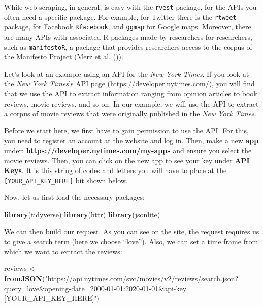 \documentclass[
]{book}
\newenvironment{Shaded}{\begin{snugshade}}{\end{snugshade}}
\newcommand{\FunctionTok}[1]{\textcolor[rgb]{0.13,0.29,0.53}{\textbf{#1}}}
\newcommand{\NormalTok}[1]{#1}
\newcommand{\OtherTok}[1]{\textcolor[rgb]{0.56,0.35,0.01}{#1}}
\newcommand{\StringTok}[1]{\textcolor[rgb]{0.31,0.60,0.02}{#1}}
\begin{document}
While web scraping, in general, is easy with the \texttt{rvest} package, for the APIs you often need a specific package. For example, for Twitter there is the \texttt{rtweet} package, for Facebook \texttt{Rfacebook}, and \texttt{ggmap} for Google maps. Moreover, there are many APIs with associated R packages made by researchers for researchers, such as \texttt{manifestoR}, a package that provides researchers access to the corpus of the Manifesto Project (Merz et al. ()).

Let's look at an example using an API for the \emph{New York Times}. If you look at the \emph{New York Times}'s API page (\url{https://developer.nytimes.com/}), you will find that we use the API to extract information ranging from opinion articles to book reviews, movie reviews, and so on. In our example, we will use the API to extract a corpus of movie reviews that were originally published in the \emph{New York Times}.

Before we start here, we first have to gain permission to use the API. For this, you need to register an account at the website and log in. Then, make a new \textbf{app} under: \textbf{\url{https://developer.nytimes.com/my-apps}} and ensure you select the movie reviews. Then, you can click on the new app to see your key under \textbf{API Keys}. It is this string of codes and letters you will have to place at the \texttt{{[}YOUR\_API\_KEY\_HERE{]}} bit shown below.

Now, let us first load the necessary packages:

\begin{Shaded}
\begin{Highlighting}[]
\FunctionTok{library}\NormalTok{(tidyverse)}
\FunctionTok{library}\NormalTok{(httr)}
\FunctionTok{library}\NormalTok{(jsonlite)}
\end{Highlighting}
\end{Shaded}

We can then build our request. As you can see on the site, the request requires us to give a search term (here we choose ``love''). Also, we can set a time frame from which we want to extract the reviews:

\begin{Shaded}
\begin{Highlighting}[]
\NormalTok{reviews }\OtherTok{\textless{}{-}} \FunctionTok{fromJSON}\NormalTok{(}\StringTok{"https://api.nytimes.com/svc/movies/v2/reviews/search.json?query=love\&opening{-}date=2000{-}01{-}01:2020{-}01{-}01\&api{-}key=[YOUR\_API\_KEY\_HERE]"}\NormalTok{)}
\end{Highlighting}
\end{Shaded}
\end{document}
